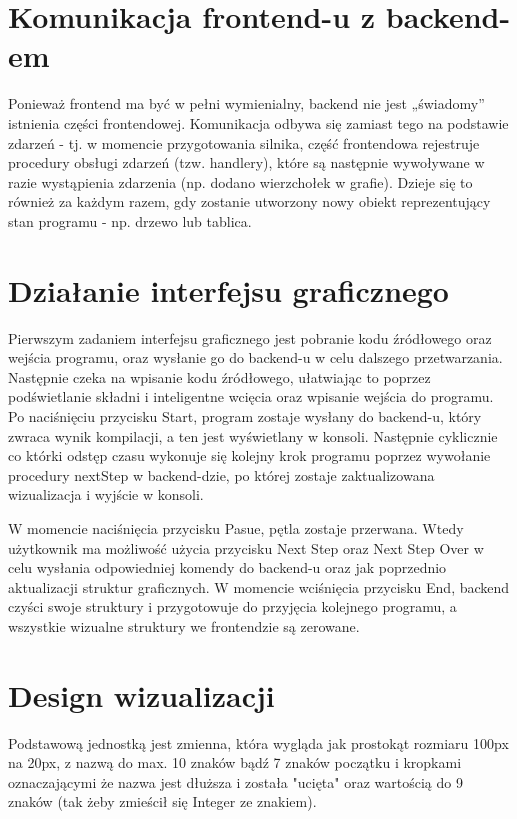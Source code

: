 \documentclass[a4paper,twoside,openright,11pt]{report}
\begin{document}
  \section{Komunikacja frontend-u z backend-em}
\par Ponieważ frontend ma być w pełni wymienialny, backend nie jest „świadomy” istnienia części frontendowej. Komunikacja odbywa się zamiast tego na podstawie zdarzeń - tj. w momencie
przygotowania silnika, część frontendowa rejestruje procedury obsługi zdarzeń (tzw. handlery), które są następnie wywoływane w razie wystąpienia zdarzenia (np. dodano wierzchołek w grafie). Dzieje się to również za każdym razem, gdy zostanie utworzony nowy obiekt reprezentujący stan programu - np. drzewo lub tablica.

  \section{Działanie interfejsu graficznego}
\par Pierwszym zadaniem interfejsu graficznego jest pobranie kodu źródłowego oraz wejścia programu, oraz wysłanie go do backend-u w celu dalszego przetwarzania. Następnie czeka na wpisanie kodu źródłowego, ułatwiając to poprzez podświetlanie składni i inteligentne wcięcia oraz wpisanie wejścia do programu. Po naciśnięciu przycisku Start, program zostaje wysłany do backend-u, który zwraca wynik kompilacji, a ten jest wyświetlany w konsoli. Następnie cyklicznie co którki odstęp czasu wykonuje się kolejny krok programu poprzez wywołanie procedury nextStep w backend-dzie, po której zostaje zaktualizowana wizualizacja i wyjście w konsoli.
\par W momencie naciśnięcia przycisku Pasue, pętla zostaje przerwana. Wtedy użytkownik ma możliwość użycia przycisku Next Step oraz Next Step Over w celu wysłania odpowiedniej komendy do backend-u oraz jak poprzednio aktualizacji struktur graficznych. W momencie wciśnięcia przycisku End, backend czyści swoje struktury i przygotowuje do przyjęcia kolejnego programu, a wszystkie wizualne struktury we frontendzie są zerowane.

  \section {Design wizualizacji}
\par Podstawową jednostką jest zmienna, która wygląda jak prostokąt rozmiaru 100px na 20px, z nazwą do max. 10 znaków bądź 7 znaków początku i kropkami oznaczającymi że nazwa jest dłuższa i została "ucięta" oraz wartością do 9 znaków (tak żeby zmieścił się Integer ze znakiem). 
\end{document}
